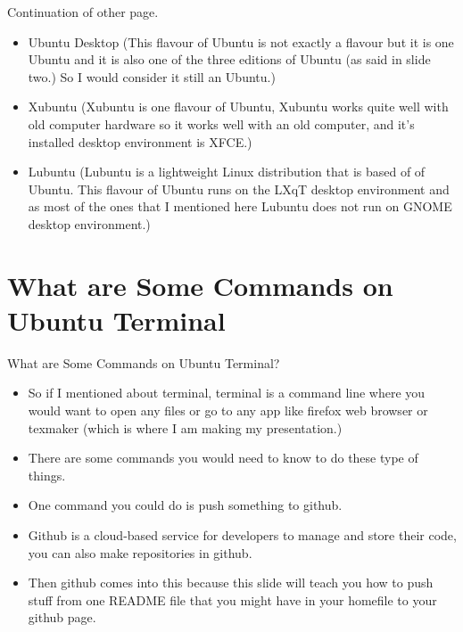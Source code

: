 \documentclass[aspectratio=43]{beamer}
\begin{document}
	
\begin{frame}{Continuation of other page.}
\begin{block}{}
\begin{itemize}

\item Ubuntu Desktop (This flavour of Ubuntu is not exactly a flavour but it is one Ubuntu and it is also one of the three editions of Ubuntu (as said in slide two.) So I would consider it still an Ubuntu.)
\item Xubuntu (Xubuntu is one flavour of Ubuntu, Xubuntu works quite well with old computer hardware so it works well with an old computer, and it's installed desktop environment is XFCE.)
\item Lubuntu (Lubuntu is a lightweight Linux distribution that is based of of Ubuntu. This flavour of Ubuntu runs on the LXqT desktop environment and as most of the ones that I mentioned here Lubuntu does not run on GNOME desktop environment.)

\end{itemize}
\end{block}
\end{frame}


\section{What are Some Commands on Ubuntu Terminal}
\begin{frame}{What are Some Commands on Ubuntu Terminal?}
\begin{itemize}

\item So if I mentioned about terminal, terminal is a command line where you would want to open any files or go to any app like firefox web browser or texmaker (which is where I am making my presentation.)
\item There are some commands you would need to know to do these type of things.
\item One command you could do is push something to github.
\item Github is a cloud-based service for developers to manage and store their code, you can also make repositories in github.
\item Then github comes into this because this slide will teach you how to push stuff from one README file that you might have in your homefile to your github page.
 

\end{itemize}
\end{frame}
\end{document}
